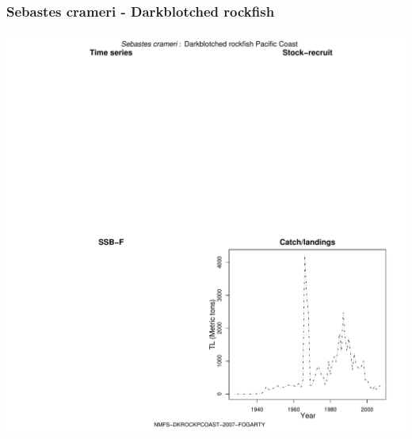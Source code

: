 \subsubsection{Sebastes crameri - Darkblotched rockfish}
\begin{center}
\includegraphics[width=1.2\textwidth]{../R/figures/NMFS-DKROCKPCOAST-2007-FOGARTY.pdf}
\end{center}

